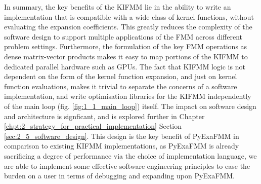 In summary, the key benefits of the \gls{KIFMM} lie in the ability to write
an implementation that is compatible with a wide class of kernel functions,
without evaluating the expansion coefficients. This greatly reduces the complexity
of the software design to support multiple applications of the FMM across
different problem settings. Furthermore, the formulation of the key FMM operations
as dense matrix-vector products makes it easy to map portions of the \gls{KIFMM}
to dedicated parallel hardware such as \gls{GPU}s. The fact that KIFMM logic
is not dependent on the form of the kernel function expansion, and just on kernel
function evaluations,  makes it trivial to separate the concerns of a software
implementation, and write optimisation libraries for the KIFMM independently of
the main loop (fig. \ref{fig:1_1_main_loop}) itself. The impact on software design
and architecture is signficant, and is explored further in Chapter \ref{chpt:2_strategy_for_practical_implementation} Section
\ref{sec:2_5_software_design}. This design is the key benefit of \gls{PyExaFMM}
in comparison to existing \gls{KIFMM} implementations, as \gls{PyExaFMM} is already
sacrificing a degree of performance via the choice of implementation language,
we are able to implement some effective software engineering principles
to ease the burden on a user in terms of debugging and expanding upon \gls{PyExaFMM}.
